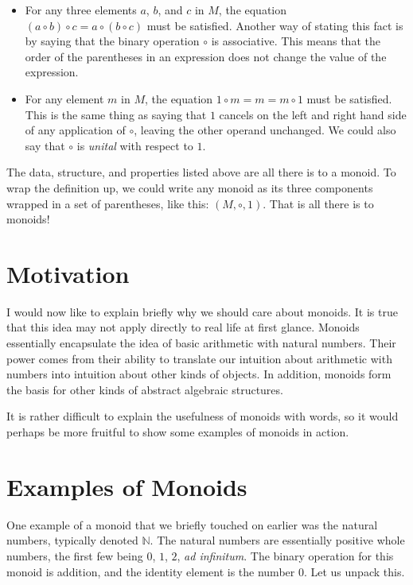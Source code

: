 \documentclass{article}
\begin{document}
\begin{itemize}
  \item For any three elements $a$, $b$, and $c$ in $M$, the equation $(a \circ
    b) \circ c = a \circ (b \circ c)$ must be satisfied. Another way of stating
    this fact is by saying that the binary operation $\circ$ is associative.
    This means that the order of the parentheses in an expression does not
    change the value of the expression.
  \item For any element $m$ in $M$, the equation $1 \circ m = m = m \circ 1$
    must be satisfied. This is the same thing as saying that $1$ cancels on the
    left and right hand side of any application of $\circ$, leaving the other
    operand unchanged. We could also say that $\circ$ is \textit{unital} with
    respect to $1$.
\end{itemize}

The data, structure, and properties listed above are all there is to a monoid.
To wrap the definition up, we could write any monoid as its three components
wrapped in a set of parentheses, like this: $(M, \circ, 1)$. That is all there
is to monoids!

\section{Motivation}

I would now like to explain briefly why we should care about monoids. It is
true that this idea may not apply directly to real life at first glance.
Monoids essentially encapsulate the idea of basic arithmetic with natural
numbers. Their power comes from their ability to translate our intuition about
arithmetic with numbers into intuition about other kinds of objects. In
addition, monoids form the basis for other kinds of abstract algebraic
structures.

It is rather difficult to explain the usefulness of monoids with words, so it
would perhaps be more fruitful to show some examples of monoids in action.

\section{Examples of Monoids}

One example of a monoid that we briefly touched on earlier was the natural
numbers, typically denoted $\mathbb{N}$. The natural numbers are essentially
positive whole numbers, the first few being $0$, $1$, $2$, \textit{ad
infinitum}. The binary operation for this monoid is addition, and the identity
element is the number $0$. Let us unpack this.
\end{document}
